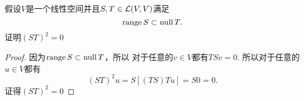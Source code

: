 \begin{problem}{2}
假设$V$是一个线性空间并且$S,T\in\mathcal{L}(V,V)$满足
\[
	\operatorname{range} S \subset \operatorname{null} T .
\]
证明$(ST)^2=0$
\end{problem}

\begin{proof}
	因为$\operatorname{range} S \subset \operatorname{null} T$，所以
	对于任意的$v\in V$都有$TSv=0$.
	所以对于任意的$u\in V$都有
	\[
		(ST)^2u=S[(TS)Tu]=S0=0.
	\]
	证得$(ST)^2=0$
\end{proof}

